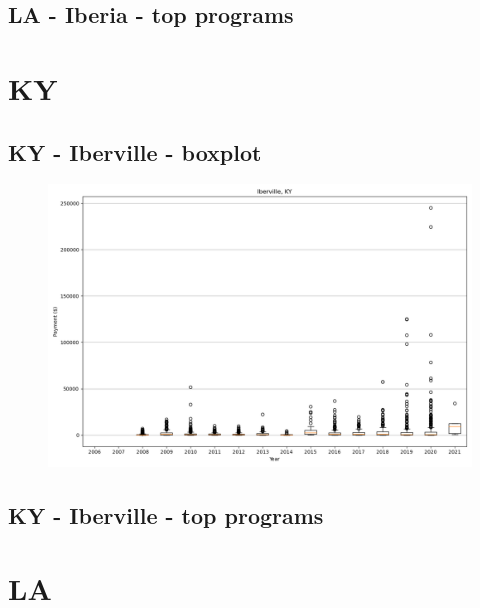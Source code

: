 \subsection*{LA - Iberia - top programs}

\newpage
\section*{KY}
\subsection*{KY - Iberville - boxplot}
\begin{figure}[h]
\centering
\includegraphics[width=7in]{../output/boxplots/counties/Iberville-KY_boxplot.png}
\end{figure}


\subsection*{KY - Iberville - top programs}

\newpage
\section*{LA}
